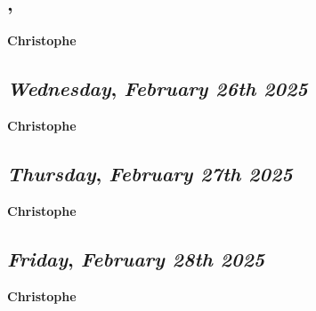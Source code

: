 \subsection*{\weekday, \day}
\textbf {Christophe}

\def\day{\textit{February 26th 2025}}
\def\weekday{\textit{Wednesday}}
\subsection*{\weekday, \day}
\textbf {Christophe}

\def\day{\textit{February 27th 2025}}
\def\weekday{\textit{Thursday}}
\subsection*{\weekday, \day}
\textbf {Christophe}

\def\day{\textit{February 28th 2025}}
\def\weekday{\textit{Friday}}
\subsection*{\weekday, \day}
\textbf {Christophe}
